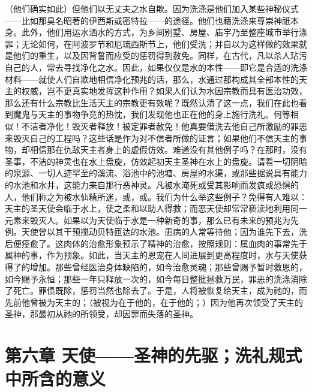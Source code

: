 （他们确实如此）但他们以无丈夫之水自欺。因为洗涤是他们加入某些神秘仪式——比如那臭名昭著的伊西斯或密特拉——的途径。他们也藉洗涤来尊崇神祇本身。此外，他们用运水洒水的方式，为乡间别墅、房屋、庙宇乃至整座城市举行涤罪；无论如何，在阿波罗节和厄琉西斯节上，他们受洗；并自以为这样做的效果就是他们的重生，以及因背誓而应受的惩罚得到赦免。同样，在古代，凡以杀人玷污自己的人，常去寻找净化之水。因此，如果仅仅是水的本性——即它是合适的洗涤材料——就使人们自欺地相信净化预兆的话，那么，水通过那构成其全部本性的天主的权威，岂不更真实地发挥这种作用？如果人们认为水因宗教而具有医治功效，那么还有什么宗教比生活天主的宗教更有效呢？既然认清了这一点，我们在此也看到魔鬼与天主的事物争竞的热忱，我们发现他也正在他的身上施行洗礼。何等相似！不洁者净化！毁灭者释放！被定罪者赦免！他真要借洗去他自己所激励的罪恶来毁灭自己的工程吗？这些话是作为对不信者所做的证言；如果他们不信天主的事物，却相信那在仇敌天主者身上的虚假仿效。难道没有其他例子吗？在那时，没有圣事，不洁的神灵也在水上盘旋，仿效起初天主圣神在水上的盘旋。请看一切阴暗的泉源、一切人迹罕至的溪流、浴池中的池塘、房屋的水渠，或那些据说具有能力的水池和水井，这能力来自那行恶神灵。凡被水淹死或受其影响而发疯或恐惧的人，他们称之为被水仙精所迷，或，或。我们为什么举这些例子？免得有人难以：天主的圣天使会临于水上，使之柔和以助人得救；而恶天使却常常亵渎地利用同一元素来毁灭人。如果以为天使临于水是一种新奇的事，那么已有未来的预兆为先例。天使曾以其干预搅动贝特匝达的水池。患病的人常等待他；因为谁先下去，洗后便痊愈了。这肉体的治愈形象预示了精神的治愈，按照规则：属血肉的事常先于属神的事，作为预象。如此，当天主的恩宠在人间进展到更高程度时，水与天使获得了的增加。那些曾经医治身体缺陷的，如今治愈灵魂；那些曾赐予暂时救恩的，如今赐予永恒；那些一年只释放一次的，如今每日整批拯救万民，罪恶的洗涤消除了死亡。罪债既除，惩罚当然也除去了。于是，人将被恢复给天主，成为祂的，而先前他曾被为天主的；（被视为在于他的，在于他的；）因为他再次领受了天主的圣神，那最初从祂的所领受，却因罪而失落的圣神。\par


\section{第六章 天使——圣神的先驱；洗礼规式中所含的意义}

